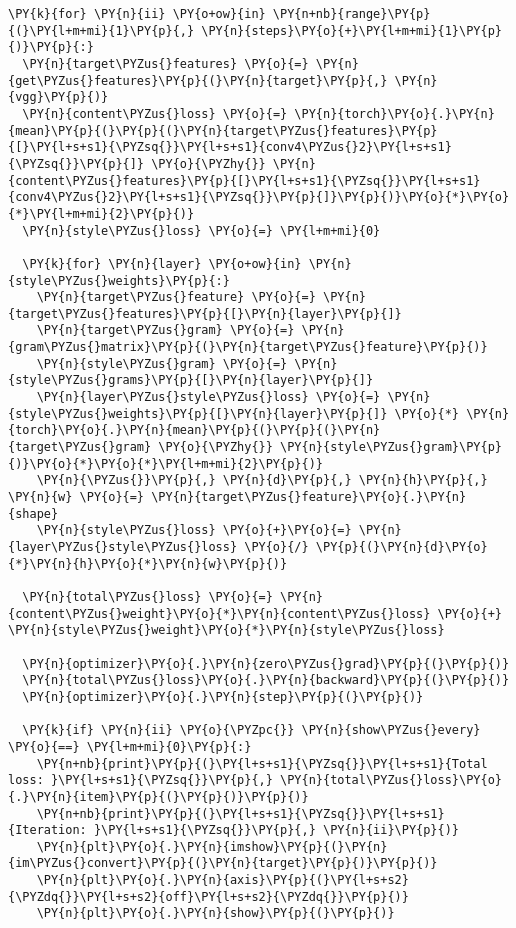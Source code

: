     \begin{tcolorbox}[breakable, size=fbox, boxrule=1pt, pad at break*=1mm,colback=cellbackground, colframe=cellborder]
\begin{Verbatim}[commandchars=\\\{\}]
\PY{k}{for} \PY{n}{ii} \PY{o+ow}{in} \PY{n+nb}{range}\PY{p}{(}\PY{l+m+mi}{1}\PY{p}{,} \PY{n}{steps}\PY{o}{+}\PY{l+m+mi}{1}\PY{p}{)}\PY{p}{:}
  \PY{n}{target\PYZus{}features} \PY{o}{=} \PY{n}{get\PYZus{}features}\PY{p}{(}\PY{n}{target}\PY{p}{,} \PY{n}{vgg}\PY{p}{)}
  \PY{n}{content\PYZus{}loss} \PY{o}{=} \PY{n}{torch}\PY{o}{.}\PY{n}{mean}\PY{p}{(}\PY{p}{(}\PY{n}{target\PYZus{}features}\PY{p}{[}\PY{l+s+s1}{\PYZsq{}}\PY{l+s+s1}{conv4\PYZus{}2}\PY{l+s+s1}{\PYZsq{}}\PY{p}{]} \PY{o}{\PYZhy{}} \PY{n}{content\PYZus{}features}\PY{p}{[}\PY{l+s+s1}{\PYZsq{}}\PY{l+s+s1}{conv4\PYZus{}2}\PY{l+s+s1}{\PYZsq{}}\PY{p}{]}\PY{p}{)}\PY{o}{*}\PY{o}{*}\PY{l+m+mi}{2}\PY{p}{)}
  \PY{n}{style\PYZus{}loss} \PY{o}{=} \PY{l+m+mi}{0}

  \PY{k}{for} \PY{n}{layer} \PY{o+ow}{in} \PY{n}{style\PYZus{}weights}\PY{p}{:}
    \PY{n}{target\PYZus{}feature} \PY{o}{=} \PY{n}{target\PYZus{}features}\PY{p}{[}\PY{n}{layer}\PY{p}{]}
    \PY{n}{target\PYZus{}gram} \PY{o}{=} \PY{n}{gram\PYZus{}matrix}\PY{p}{(}\PY{n}{target\PYZus{}feature}\PY{p}{)}
    \PY{n}{style\PYZus{}gram} \PY{o}{=} \PY{n}{style\PYZus{}grams}\PY{p}{[}\PY{n}{layer}\PY{p}{]}
    \PY{n}{layer\PYZus{}style\PYZus{}loss} \PY{o}{=} \PY{n}{style\PYZus{}weights}\PY{p}{[}\PY{n}{layer}\PY{p}{]} \PY{o}{*} \PY{n}{torch}\PY{o}{.}\PY{n}{mean}\PY{p}{(}\PY{p}{(}\PY{n}{target\PYZus{}gram} \PY{o}{\PYZhy{}} \PY{n}{style\PYZus{}gram}\PY{p}{)}\PY{o}{*}\PY{o}{*}\PY{l+m+mi}{2}\PY{p}{)}
    \PY{n}{\PYZus{}}\PY{p}{,} \PY{n}{d}\PY{p}{,} \PY{n}{h}\PY{p}{,} \PY{n}{w} \PY{o}{=} \PY{n}{target\PYZus{}feature}\PY{o}{.}\PY{n}{shape}
    \PY{n}{style\PYZus{}loss} \PY{o}{+}\PY{o}{=} \PY{n}{layer\PYZus{}style\PYZus{}loss} \PY{o}{/} \PY{p}{(}\PY{n}{d}\PY{o}{*}\PY{n}{h}\PY{o}{*}\PY{n}{w}\PY{p}{)}

  \PY{n}{total\PYZus{}loss} \PY{o}{=} \PY{n}{content\PYZus{}weight}\PY{o}{*}\PY{n}{content\PYZus{}loss} \PY{o}{+} \PY{n}{style\PYZus{}weight}\PY{o}{*}\PY{n}{style\PYZus{}loss}

  \PY{n}{optimizer}\PY{o}{.}\PY{n}{zero\PYZus{}grad}\PY{p}{(}\PY{p}{)}
  \PY{n}{total\PYZus{}loss}\PY{o}{.}\PY{n}{backward}\PY{p}{(}\PY{p}{)}
  \PY{n}{optimizer}\PY{o}{.}\PY{n}{step}\PY{p}{(}\PY{p}{)}

  \PY{k}{if} \PY{n}{ii} \PY{o}{\PYZpc{}} \PY{n}{show\PYZus{}every} \PY{o}{==} \PY{l+m+mi}{0}\PY{p}{:}
    \PY{n+nb}{print}\PY{p}{(}\PY{l+s+s1}{\PYZsq{}}\PY{l+s+s1}{Total loss: }\PY{l+s+s1}{\PYZsq{}}\PY{p}{,} \PY{n}{total\PYZus{}loss}\PY{o}{.}\PY{n}{item}\PY{p}{(}\PY{p}{)}\PY{p}{)}
    \PY{n+nb}{print}\PY{p}{(}\PY{l+s+s1}{\PYZsq{}}\PY{l+s+s1}{Iteration: }\PY{l+s+s1}{\PYZsq{}}\PY{p}{,} \PY{n}{ii}\PY{p}{)}
    \PY{n}{plt}\PY{o}{.}\PY{n}{imshow}\PY{p}{(}\PY{n}{im\PYZus{}convert}\PY{p}{(}\PY{n}{target}\PY{p}{)}\PY{p}{)}
    \PY{n}{plt}\PY{o}{.}\PY{n}{axis}\PY{p}{(}\PY{l+s+s2}{\PYZdq{}}\PY{l+s+s2}{off}\PY{l+s+s2}{\PYZdq{}}\PY{p}{)}
    \PY{n}{plt}\PY{o}{.}\PY{n}{show}\PY{p}{(}\PY{p}{)}
  

\end{Verbatim}
\end{tcolorbox}
